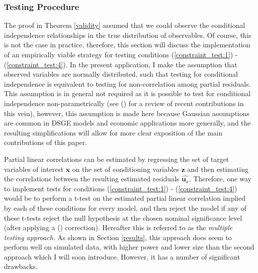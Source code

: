 \documentclass{article}
\begin{document}
\subsubsection{Testing Procedure} \label{testing}

The proof in Theorem \ref{validity} assumed that we could observe the conditional independence relationships in the true distribution of observables. Of course, this is not the case in practice, therefore, this section will discuss the implementation of an empirically viable strategy for testing conditions (\ref{constraint_test:1}) - (\ref{constraint_test:4}). In the present application, I make the assumption that observed variables are normally distributed, such that testing for conditional independence is equivalent to testing for non-correlation among partial residuals. This assumption is in general not required as it is possible to test for conditional independence non-parametrically (see \citeauthor{strobl2019approximate} (\citeyear{strobl2019approximate}) for a review of recent contributions in this vein), however, this assumption is made here because Gaussian assumptions are common in DSGE models and economic applications more generally, and the resulting simplifications will allow for more clear exposition of the main contributions of this paper. 

Partial linear correlations can be estimated by regressing the set of target variables of interest $\mathbf{x}$ on the set of conditioning variables $\mathbf{z}$ and then estimating the correlations between the resulting estimated residuals $\hat{\mathbf{u}_x}$. Therefore, one way to implement tests for conditions (\ref{constraint_test:1}) - (\ref{constraint_test:4}) would be to perform a t-test on the estimated partial linear correlation implied by each of these conditions for every model, and then reject the model if any of these t-tests reject the null hypothesis at the chosen nominal significance level (after applying a \citeauthor{bonferroni1936teoria} (\citeyear{bonferroni1936teoria}) correction). Hereafter this is referred to as the \textit{multiple testing approach}. As shown in Section \ref{results}, this approach does seem to perform well on simulated data, with higher power and lower size than the second approach which I will soon introduce. However, it has a number of significant drawbacks. 
\end{document}
